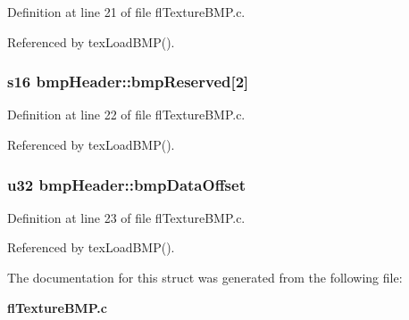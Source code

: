 Definition at line 21 of file fl\-Texture\-BMP.c.

Referenced by tex\-Load\-BMP().
\subsubsection{\setlength{\rightskip}{0pt plus 5cm}s16 {\bf bmp\-Header::bmp\-Reserved}[2]}\label{structbmpHeader_5f2e94313a74dd7cd1117564fb2888fb}




Definition at line 22 of file fl\-Texture\-BMP.c.

Referenced by tex\-Load\-BMP().
\subsubsection{\setlength{\rightskip}{0pt plus 5cm}u32 {\bf bmp\-Header::bmp\-Data\-Offset}}\label{structbmpHeader_1f503e0fe895f70ac6bec060710d9615}




Definition at line 23 of file fl\-Texture\-BMP.c.

Referenced by tex\-Load\-BMP().

The documentation for this struct was generated from the following file:\begin{CompactItemize}
\item 
{\bf fl\-Texture\-BMP.c}\end{CompactItemize}
